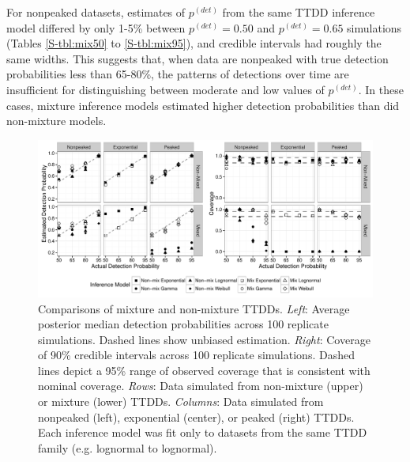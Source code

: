 \documentclass[12pt]{article}
\newcommand{\pdet}{p^{(det)}}
\begin{document}
For nonpeaked datasets, estimates of $\pdet$ from the same TTDD inference model differed by only 1-5\% between $\pdet=0.50$ and $\pdet=0.65$ simulations (Tables \ref{S-tbl:mix50} to \ref{S-tbl:mix95}), and credible intervals had roughly the same widths.
This suggests that, when data are nonpeaked with true detection probabilities less than 65-80\%, the patterns of detections over time are insufficient for distinguishing between moderate and low values of $\pdet$.
In these cases, mixture inference models estimated higher detection probabilities than did non-mixture models.

\begin{figure}\centering
\includegraphics[width=\textwidth]{"Sims/SimZero/mixture_fig"}
\caption{
Comparisons of mixture and non-mixture TTDDs.  \textit{Left}: Average posterior median detection probabilities across 100 replicate simulations.  Dashed lines show unbiased estimation.   \textit{Right}: Coverage of 90\% credible intervals across 100 replicate simulations.  Dashed lines depict a 95\% range of observed coverage that is consistent with nominal coverage.  \textit{Rows}: Data simulated from non-mixture (upper) or mixture (lower) TTDDs.  \textit{Columns}:  Data simulated from nonpeaked (left), exponential (center), or peaked (right) TTDDs.  Each inference model was fit only to datasets from the same TTDD family (e.g. lognormal to lognormal).
}
\label{fig:mixture_fig} 
\end{figure}
\end{document}
